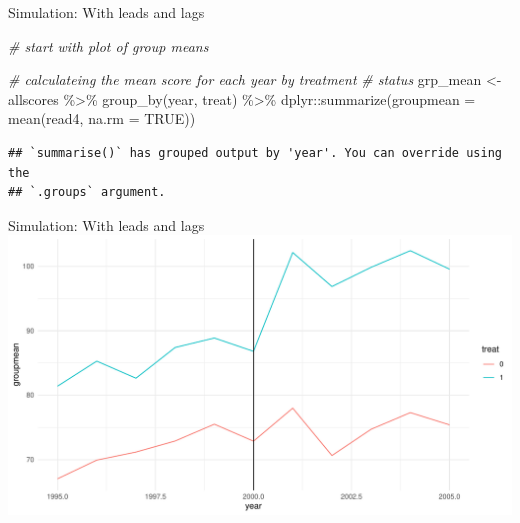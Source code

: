 \documentclass[
  ignorenonframetext,
]{beamer}
\newenvironment{Shaded}{\begin{snugshade}}{\end{snugshade}}
\newcommand{\AttributeTok}[1]{\textcolor[rgb]{0.77,0.63,0.00}{#1}}
\newcommand{\CommentTok}[1]{\textcolor[rgb]{0.56,0.35,0.01}{\textit{#1}}}
\newcommand{\ConstantTok}[1]{\textcolor[rgb]{0.00,0.00,0.00}{#1}}
\newcommand{\DecValTok}[1]{\textcolor[rgb]{0.00,0.00,0.81}{#1}}
\newcommand{\FunctionTok}[1]{\textcolor[rgb]{0.00,0.00,0.00}{#1}}
\newcommand{\NormalTok}[1]{#1}
\newcommand{\OtherTok}[1]{\textcolor[rgb]{0.56,0.35,0.01}{#1}}
\newcommand{\SpecialCharTok}[1]{\textcolor[rgb]{0.00,0.00,0.00}{#1}}
\newcommand{\StringTok}[1]{\textcolor[rgb]{0.31,0.60,0.02}{#1}}
\begin{document}
\begin{frame}[fragile]{Simulation: With leads and lags}
\protect\hypertarget{simulation-with-leads-and-lags-4}{}
\tiny

\begin{Shaded}
\begin{Highlighting}[]
\CommentTok{\# start with plot of group means}

\CommentTok{\# calculateing the mean score for each year by treatment}
\CommentTok{\# status}
\NormalTok{grp\_mean }\OtherTok{\textless{}{-}}\NormalTok{ allscores }\SpecialCharTok{\%\textgreater{}\%}
    \FunctionTok{group\_by}\NormalTok{(year, treat) }\SpecialCharTok{\%\textgreater{}\%}
\NormalTok{    dplyr}\SpecialCharTok{::}\FunctionTok{summarize}\NormalTok{(}\AttributeTok{groupmean =} \FunctionTok{mean}\NormalTok{(read4, }\AttributeTok{na.rm =} \ConstantTok{TRUE}\NormalTok{))}
\end{Highlighting}
\end{Shaded}

\begin{verbatim}
## `summarise()` has grouped output by 'year'. You can override using the
## `.groups` argument.
\end{verbatim}

\begin{Shaded}
\end{Shaded}
\end{frame}

\begin{frame}{Simulation: With leads and lags}
\protect\hypertarget{simulation-with-leads-and-lags-5}{}
\includegraphics{"Slides_DID_files/figure-beamer/didplot-1.pdf"}
\end{frame}
\end{document}
